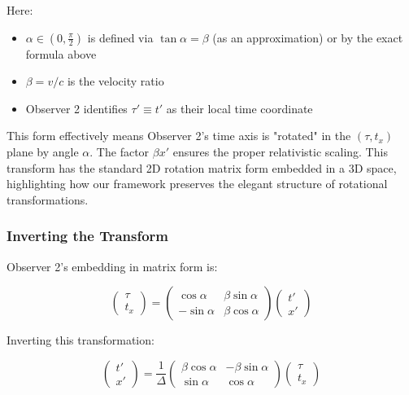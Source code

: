 \documentclass{article}
\begin{document}
Here:
\begin{itemize}
\item $\alpha \in (0, \frac{\pi}{2})$ is defined via $\tan\alpha = \beta$ (as an approximation) or by the exact formula above
\item $\beta = v/c$ is the velocity ratio
\item Observer 2 identifies $\tau' \equiv t'$ as their local time coordinate
\end{itemize}

This form effectively means Observer 2's time axis is "rotated" in the $(\tau, t_x)$ plane by angle $\alpha$. The factor $\beta x'$ ensures the proper relativistic scaling. This transform has the standard 2D rotation matrix form embedded in a 3D space, highlighting how our framework preserves the elegant structure of rotational transformations.

\subsubsection{Inverting the Transform}

Observer 2's embedding in matrix form is:

\begin{equation}
\begin{pmatrix} \tau \\ t_x \end{pmatrix} = 
\begin{pmatrix} \cos\alpha & \beta\sin\alpha \\ -\sin\alpha & \beta\cos\alpha \end{pmatrix}
\begin{pmatrix} t' \\ x' \end{pmatrix}
\end{equation}

Inverting this transformation:

\begin{equation}
\begin{pmatrix} t' \\ x' \end{pmatrix} = 
\frac{1}{\Delta}
\begin{pmatrix} \beta\cos\alpha & -\beta\sin\alpha \\ \sin\alpha & \cos\alpha \end{pmatrix}
\begin{pmatrix} \tau \\ t_x \end{pmatrix}
\end{equation}
\end{document}
